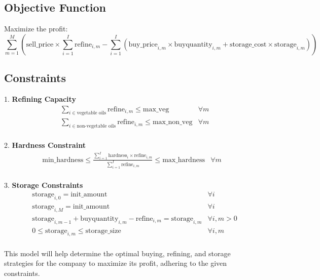 \documentclass{article}
\begin{document}
\subsection*{Objective Function}

Maximize the profit:
\[
\sum_{m=1}^{M} \left( \text{sell\_price} \times \sum_{i=1}^{I} \text{refine}_{i,m} - \sum_{i=1}^{I} (\text{buy\_price}_{i,m} \times \text{buyquantity}_{i,m} + \text{storage\_cost} \times \text{storage}_{i,m}) \right)
\]

\subsection*{Constraints}

1. \textbf{Refining Capacity}
\begin{align*}
& \sum_{i \in \text{vegetable oils}} \text{refine}_{i,m} \leq \text{max\_veg} & \forall m \\
& \sum_{i \in \text{non-vegetable oils}} \text{refine}_{i,m} \leq \text{max\_non\_veg} & \forall m \\
\end{align*}

2. \textbf{Hardness Constraint}
\begin{align*}
\text{min\_hardness} \leq \frac{\sum_{i=1}^{I} \text{hardness}_i \times \text{refine}_{i,m}}{\sum_{i=1}^{I} \text{refine}_{i,m}} \leq \text{max\_hardness} & \forall m \\
\end{align*}

3. \textbf{Storage Constraints}
\begin{align*}
& \text{storage}_{i,0} = \text{init\_amount} & \forall i \\
& \text{storage}_{i,M} = \text{init\_amount} & \forall i \\
& \text{storage}_{i,m-1} + \text{buyquantity}_{i,m} - \text{refine}_{i,m} = \text{storage}_{i,m} & \forall i, m > 0 \\
& 0 \leq \text{storage}_{i,m} \leq \text{storage\_size} & \forall i, m \\
\end{align*}

This model will help determine the optimal buying, refining, and storage strategies for the company to maximize its profit, adhering to the given constraints.
\end{document}
